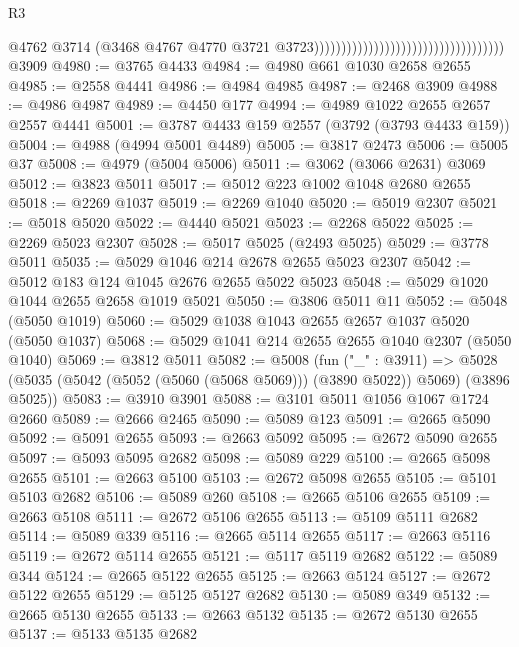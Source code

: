 \begin{lexlean}{R3}
\begin{coremodule}
                                                                        @4762
                                                                        @3714
                                                                        (@3468
                                                                          @4767
                                                                          @4770
                                                                          @3721
                                                                          @3723)))))))))))))))))))))))))))))))))))
    @3909
@4980 := @3765 @4433
@4984 := @4980 @661 @1030 @2658 @2655
@4985 := @2558 @4441
@4986 := @4984 @4985
@4987 := @2468 @3909
@4988 := @4986 @4987
@4989 := @4450 @177
@4994 := @4989 @1022 @2655 @2657 @2557 @4441
@5001 := @3787 @4433 @159 @2557 (@3792 (@3793 @4433 @159))
@5004 := @4988 (@4994 @5001 @4489)
@5005 := @3817 @2473
@5006 := @5005 @37
@5008 := @4979 (@5004 @5006)
@5011 := @3062 (@3066 @2631) @3069
@5012 := @3823 @5011
@5017 := @5012 @223 @1002 @1048 @2680 @2655
@5018 := @2269 @1037
@5019 := @2269 @1040
@5020 := @5019 @2307
@5021 := @5018 @5020
@5022 := @4440 @5021
@5023 := @2268 @5022
@5025 := @2269 @5023 @2307
@5028 := @5017 @5025 (@2493 @5025)
@5029 := @3778 @5011
@5035 := @5029 @1046 @214 @2678 @2655 @5023 @2307
@5042 := @5012 @183 @124 @1045 @2676 @2655 @5022 @5023
@5048 := @5029 @1020 @1044 @2655 @2658 @1019 @5021
@5050 := @3806 @5011 @11
@5052 := @5048 (@5050 @1019)
@5060 := @5029 @1038 @1043 @2655 @2657 @1037 @5020 (@5050 @1037)
@5068 := @5029 @1041 @214 @2655 @2655 @1040 @2307 (@5050 @1040)
@5069 := @3812 @5011
@5082 := @5008
    (fun ("_" : @3911) =>
    @5028 (@5035 (@5042 (@5052 (@5060 (@5068 @5069))) (@3890 @5022)) @5069) (@3896 @5025))
@5083 := @3910 @3901
@5088 := @3101 @5011 @1056 @1067 @1724 @2660
@5089 := @2666 @2465
@5090 := @5089 @123
@5091 := @2665 @5090
@5092 := @5091 @2655
@5093 := @2663 @5092
@5095 := @2672 @5090 @2655
@5097 := @5093 @5095 @2682
@5098 := @5089 @229
@5100 := @2665 @5098 @2655
@5101 := @2663 @5100
@5103 := @2672 @5098 @2655
@5105 := @5101 @5103 @2682
@5106 := @5089 @260
@5108 := @2665 @5106 @2655
@5109 := @2663 @5108
@5111 := @2672 @5106 @2655
@5113 := @5109 @5111 @2682
@5114 := @5089 @339
@5116 := @2665 @5114 @2655
@5117 := @2663 @5116
@5119 := @2672 @5114 @2655
@5121 := @5117 @5119 @2682
@5122 := @5089 @344
@5124 := @2665 @5122 @2655
@5125 := @2663 @5124
@5127 := @2672 @5122 @2655
@5129 := @5125 @5127 @2682
@5130 := @5089 @349
@5132 := @2665 @5130 @2655
@5133 := @2663 @5132
@5135 := @2672 @5130 @2655
@5137 := @5133 @5135 @2682

\end{coremodule}
\end{lexlean}
